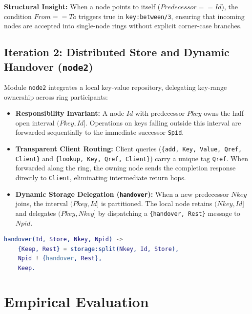 \documentclass[a4paper, 11pt]{article}
\begin{document}
\noindent \textbf{Structural Insight:} When a node points to itself ($Predecessor == Id$), the condition $From == To$ triggers true in \texttt{key:between/3}, ensuring that incoming nodes are accepted into single-node rings without explicit corner-case branches.

\subsection{Iteration 2: Distributed Store and Dynamic Handover (\texttt{node2})}
Module \texttt{node2} integrates a local key-value repository, delegating key-range ownership across ring participants:
\begin{itemize}
    \item \textbf{Responsibility Invariant:} A node $Id$ with predecessor $Pkey$ owns the half-open interval $(Pkey, Id]$. Operations on keys falling outside this interval are forwarded sequentially to the immediate successor \texttt{Spid}.
    \item \textbf{Transparent Client Routing:} Client queries (\texttt{\{add, Key, Value, Qref, Client\}} and \texttt{\{lookup, Key, Qref, Client\}}) carry a unique tag \texttt{Qref}. When forwarded along the ring, the owning node sends the completion response directly to \texttt{Client}, eliminating intermediate return hops.
    \item \textbf{Dynamic Storage Delegation (\texttt{handover}):} When a new predecessor $Nkey$ joins, the interval $(Pkey, Id]$ is partitioned. The local node retains $(Nkey, Id]$ and delegates $(Pkey, Nkey]$ by dispatching a \texttt{\{handover, Rest\}} message to $Npid$.
\end{itemize}

\begin{lstlisting}[language=erlang]
handover(Id, Store, Nkey, Npid) ->
    {Keep, Rest} = storage:split(Nkey, Id, Store),
    Npid ! {handover, Rest},
    Keep.
\end{lstlisting}

\section{Empirical Evaluation}
\end{document}
